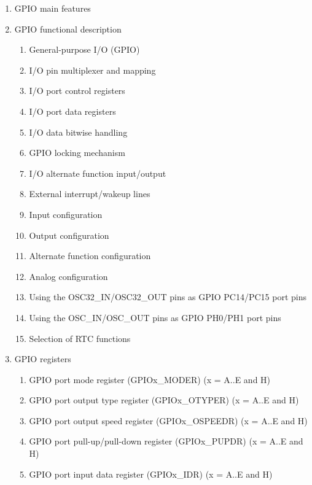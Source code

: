 \documentclass{article}
\begin{document}
\begin{enumerate}
\begin{enumerate}
        \item GPIO main features 
        \item GPIO functional description 
        \begin{enumerate}
            \item General-purpose I/O (GPIO) 
            \item I/O pin multiplexer and mapping 
            \item I/O port control registers 
            \item I/O port data registers 
            \item I/O data bitwise handling 
            \item GPIO locking mechanism 
            \item I/O alternate function input/output 
            \item External interrupt/wakeup lines 
            \item Input configuration 
            \item Output configuration 
            \item Alternate function configuration 
            \item Analog configuration 
            \item Using the OSC32\_IN/OSC32\_OUT pins as GPIO PC14/PC15 port pins 
            \item Using the OSC\_IN/OSC\_OUT pins as GPIO PH0/PH1 port pins 
            \item Selection of RTC functions 
        \end{enumerate}
        \item GPIO registers 
        \begin{enumerate}
            \item GPIO port mode register (GPIOx\_MODER) (x = A..E and H) 
            \item GPIO port output type register (GPIOx\_OTYPER) (x = A..E and H) 
            \item GPIO port output speed register (GPIOx\_OSPEEDR) (x = A..E and H) 
            \item GPIO port pull-up/pull-down register (GPIOx\_PUPDR) (x = A..E and H) 
            \item GPIO port input data register (GPIOx\_IDR) (x = A..E and H) 

\end{enumerate}
\end{enumerate}
\end{enumerate}
\end{document}

